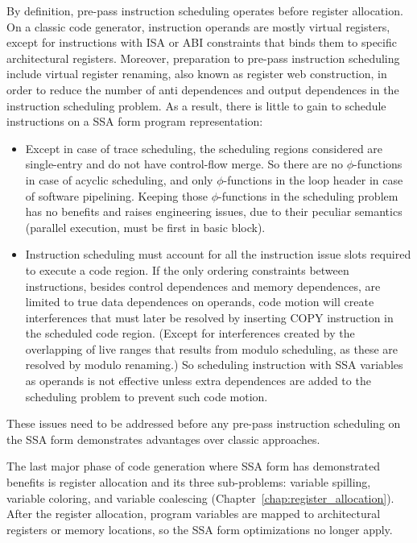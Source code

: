 By definition, pre-pass instruction scheduling operates before register
allocation. On a classic code generator, instruction operands are mostly virtual
registers, except for instructions with ISA or ABI constraints that binds them
to specific architectural registers. Moreover, preparation to pre-pass
instruction scheduling include virtual register renaming, also known as register
web construction, in order to reduce the number of anti dependences and output
dependences in the instruction scheduling problem. As a result, there is little
to gain to schedule instructions on a SSA form program representation:
\begin{itemize}

\item Except in case of trace scheduling, the scheduling regions considered are
single-entry and do not have control-flow merge. So there are no
$\phi$-functions in case of acyclic scheduling, and only $\phi$-functions in the
loop header in case of software pipelining. Keeping those $\phi$-functions in
the scheduling problem has no benefits and raises engineering issues, due to
their peculiar semantics (parallel execution, must be first in basic block).

\item Instruction scheduling must account for all the instruction issue slots
required to execute a code region. If the only ordering constraints between
instructions, besides control dependences and memory dependences, are limited to
true data dependences on operands, code motion will create interferences that
must later be resolved by inserting COPY instruction in the scheduled code
region. (Except for interferences created by the overlapping of live ranges
that results from modulo scheduling, as these are resolved by modulo renaming.)
So scheduling instruction with SSA variables as operands is not effective unless
extra dependences are added to the scheduling problem to prevent such code
motion. 

\end{itemize} These issues need to be addressed before any pre-pass instruction
scheduling on the SSA form demonstrates advantages over classic approaches.

The last major phase of code generation where SSA form has demonstrated benefits
is register allocation and its three sub-problems: variable spilling, variable
coloring, and variable coalescing (Chapter~\ref{chap:register_allocation}). After
the register allocation, program variables are mapped to architectural registers
or memory locations, so the SSA form optimizations no longer apply.

